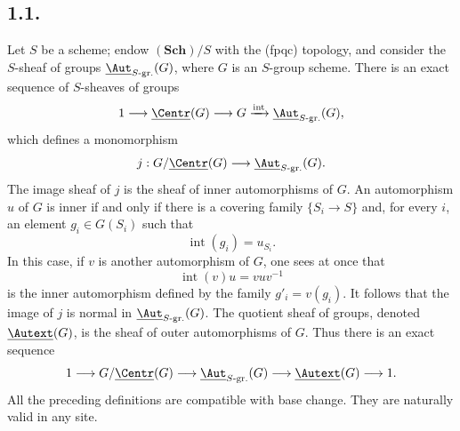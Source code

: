 \subsection*{1.1.}
Let \(S\) be a scheme; endow \((\mathbf{Sch})/S\) with the
\textup{(fpqc)} topology, and consider the \(S\)-sheaf of groups
\(\underline{\Aut}_{S\text{-}\mathrm{gr.}}(G)\), where \(G\) is an
\(S\)-group scheme. There is an exact sequence of \(S\)-sheaves of
groups
\[
  1\longrightarrow \underline{\Centr}(G)
  \longrightarrow G
  \xrightarrow{\mathrm{int}}
  \underline{\Aut}_{S\text{-}\mathrm{gr.}}(G),
\]
which defines a monomorphism
\[
  j:G/\underline{\Centr}(G)
  \longrightarrow \underline{\Aut}_{S\text{-}\mathrm{gr.}}(G).
\]
The image sheaf of \(j\) is the sheaf of inner automorphisms of \(G\).
An automorphism \(u\) of \(G\) is inner if and only if there is a
covering family \(\{S_i\to S\}\) and, for every \(i\), an element
\(g_i\in G(S_i)\) such that
\[
  \operatorname{int}(g_i)=u_{S_i}.
\]
In this case, if \(v\) is another automorphism of \(G\), one sees at
once that
\[
  \operatorname{int}(v)u=vuv^{-1}
\]
is the inner automorphism defined by the family
\(g'_i=v(g_i)\). It follows that the image of \(j\) is normal in
\(\underline{\Aut}_{S\text{-}\mathrm{gr.}}(G)\). The quotient sheaf of
groups, denoted \(\underline{\Autext}(G)\), is the sheaf of outer
automorphisms of \(G\). Thus there is an exact sequence
\[
  1\longrightarrow G/\underline{\Centr}(G)
  \longrightarrow \underline{\Aut}_{S\text{-}\mathrm{gr.}}(G)
  \longrightarrow \underline{\Autext}(G)
  \longrightarrow 1.
\]
All the preceding definitions are compatible with base change. They
are naturally valid in any site.

